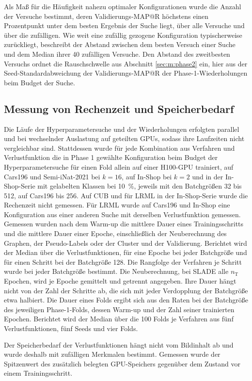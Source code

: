Als Maß für die Häufigkeit nahezu optimaler Konfigurationen wurde die Anzahl der Versuche bestimmt, deren Validierungs-\ac{MAP@R} höchstens einen Prozentpunkt unter dem besten Ergebnis der Suche liegt, über alle Versuche und über die zufälligen. Wie weit eine zufällig gezogene Konfiguration typischerweise zurückliegt, beschreibt der Abstand zwischen dem besten Versuch einer Suche und dem Median ihrer 40 zufälligen Versuche. Den Abstand des zweitbesten Versuchs ordnet die Rauschschwelle aus Abschnitt \ref{sec:m:phase2} ein, hier aus der Seed-Standardabweichung der Validierungs-\ac{MAP@R} der Phase-1-Wiederholungen beim Budget der Suche.

\subsection{Messung von Rechenzeit und Speicherbedarf}
\label{sec:m:aufwand}

Die Läufe der Hyperparametersuche und der Wiederholungen erfolgten parallel und bei wechselnder Auslastung auf geteilten \acp{GPU}, sodass ihre Laufzeiten nicht vergleichbar sind. Stattdessen wurde für jede Kombination aus Verfahren und Verlustfunktion die in Phase 1 gewählte Konfiguration beim Budget der Hyperparametersuche für einen Fold allein auf einer H100-\ac{GPU} trainiert, auf Cars196 und Semi-iNat-2021 bei $k=16$, auf In-Shop bei $k=2$ und in der In-Shop-Serie mit gelabelten Klassen bei \qty{10}{\percent}, jeweils mit den Batchgrößen 32 bis 512, auf Cars196 bis 256. Auf \ac{CUB} und für \ac{LRML} in der In-Shop-Serie wurde die Rechenzeit nicht gemessen. Für \ac{LRML} wurde auf Cars196 und In-Shop eine Konfiguration aus einer anderen Suche mit derselben Verlustfunktion gemessen. Gemessen wurden nach dem Warm-up die mittlere Dauer eines Trainingsschritts und die mittlere Dauer einer Epoche, einschließlich der Neuberechnung des Graphen, der Pseudo-Labels oder der Cluster und der Validierung. Berichtet wird der Median über die Verlustfunktionen, für eine Epoche bei jeder Batchgröße und für einen Schritt bei der Batchgröße 128. Die Rangfolge der Verfahren je Schritt wurde bei jeder Batchgröße bestimmt. Die Neuberechnung, bei \ac{SLADE} alle $n_{\mathrm{T}}$ Epochen, wird je Epoche gemittelt und getrennt angegeben. Ihre Dauer hängt nicht von der Zahl der Schritte ab, die sich mit jeder Verdopplung der Batchgröße etwa halbiert. Die Dauer eines Folds ergibt sich aus den Raten bei der Batchgröße des jeweiligen Phase-1-Folds, dessen Warm-up und der Zahl seiner trainierten Epochen. Berichtet wird der Median über die 100 Folds je Verfahren aus fünf Verlustfunktionen, fünf Seeds und vier Folds. 

Der Speicherbedarf der Verlustfunktionen hängt nicht vom Bildinhalt ab und wurde deshalb mit zufälligen Merkmalen bestimmt. Gemessen wurde der Spitzenwert des zusätzlich belegten \ac{GPU}-Speichers gegenüber dem Zustand vor einem Trainingsschritt.
